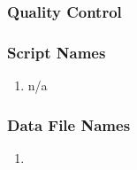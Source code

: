 \subsubsection*{Quality Control}
\subsubsection*{Script Names}
\begin{enumerate}
\item n/a
\end{enumerate}
\subsubsection*{Data File Names}
\begin{enumerate}
\item 
\end{enumerate}